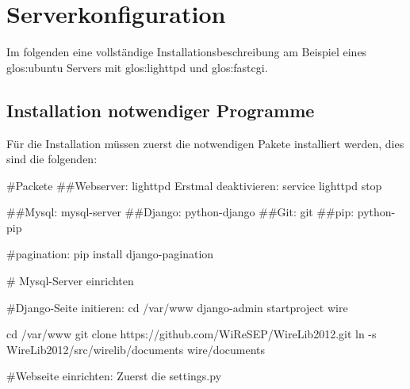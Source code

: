 \chapter{Serverkonfiguration}
Im folgenden eine vollständige Installationsbeschreibung am Beispiel eines
\Gls{glos:ubuntu} Servers mit \Gls{glos:lighttpd} und \Gls{glos:fastcgi}.

\section{Installation notwendiger Programme}
Für die Installation müssen zuerst die notwendigen Pakete installiert werden,
dies sind die folgenden:

#Packete
##Webserver: lighttpd
Erstmal deaktivieren: service lighttpd stop

##Mysql: mysql-server
##Django: python-django
##Git: git
##pip: python-pip

#pagination: pip install django-pagination 

# Mysql-Server einrichten

#Django-Seite initieren:
  cd /var/www
  django-admin startproject wire

  cd /var/www
  git clone https://github.com/WiReSEP/WireLib2012.git
  ln -s WireLib2012/src/wirelib/documents wire/documents

#Webseite einrichten:
Zuerst die settings.py
